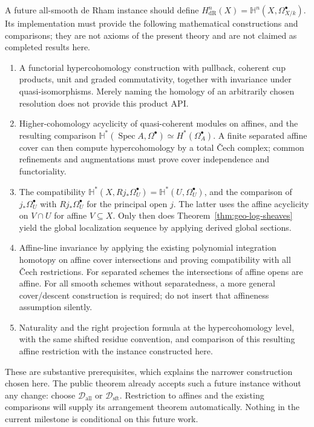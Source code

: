 \documentclass[11pt]{article}
\newcommand{\Spec}{\operatorname{Spec}}
\theoremstyle{definition}
\theoremstyle{remark}
\newcommand{\Dom}{\mathcal D}
\newcommand{\Om}{\Omega}
\newcommand{\dR}{\mathrm{dR}}
\newcommand{\HH}{\mathbb H}
\renewcommand{\Spec}{\ensuremath{\operatorname{Spec}}}
\begin{document}
A future all-smooth de Rham instance should define $H^n_{\dR}(X)=\HH^n(X,\Om^\bullet_{X/k})$. Its implementation must provide the following mathematical constructions and comparisons; they are not axioms of the present theory and are not claimed as completed results here.
\begin{enumerate}
\item A functorial hypercohomology construction with pullback, coherent cup products, unit and graded commutativity, together with invariance under quasi-isomorphisms. Merely naming the homology of an arbitrarily chosen resolution does not provide this product API.
\item Higher-cohomology acyclicity of quasi-coherent modules on affines, and the resulting comparison $\HH^*(\Spec A,\Om^\bullet)\simeq H^*(\Om_A^\bullet)$. A finite separated affine cover can then compute hypercohomology by a total \v{C}ech complex; common refinements and augmentations must prove cover independence and functoriality.
\item The compatibility $\HH^*(X,Rj_*\Om_U^\bullet)=\HH^*(U,\Om_U^\bullet)$, and the comparison of $j_*\Om_U^\bullet$ with $Rj_*\Om_U^\bullet$ for the principal open $j$. The latter uses the affine acyclicity on $V\cap U$ for affine $V\subseteq X$. Only then does Theorem~\ref{thm:geo-log-sheaves} yield the global localization sequence by applying derived global sections.
\item Affine-line invariance by applying the existing polynomial integration homotopy on affine cover intersections and proving compatibility with all \v{C}ech restrictions. For separated schemes the intersections of affine opens are affine. For all smooth schemes without separatedness, a more general cover/descent construction is required; do not insert that affineness assumption silently.
\item Naturality and the right projection formula at the hypercohomology level, with the same shifted residue convention, and comparison of this resulting affine restriction with the instance constructed here.
\end{enumerate}
These are substantive prerequisites, which explains the narrower construction chosen here. The public theorem already accepts such a future instance without any change: choose $\Dom_{\mathrm{all}}$ or $\Dom_{\mathrm{sft}}$. Restriction to affines and the existing comparisons will supply its arrangement theorem automatically. Nothing in the current milestone is conditional on this future work.
\end{document}

